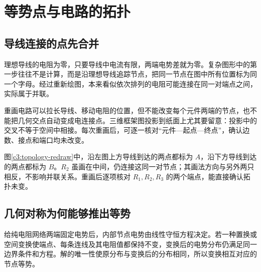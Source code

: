 \section{等势点与电路的拓扑}
\subsection{导线连接的点先合并}

理想导线的电阻为零，只要导线中电流有限，两端电势差就为零。复杂图形中的第一步往往不是计算，而是沿理想导线追踪节点，把同一节点在图中所有位置标为同一个字母。经过重新绘图，本来看似依次排列的电阻可能连接在同一对端点之间，实际属于并联。

重画电路可以拉长导线、移动电阻的位置，但不能改变每个元件两端的节点，也不能把几何交点自动变成电连接点。三维框架图投影到纸面上尤其要留意：投影中的交叉不等于空间中相接。每次重画后，可逐一核对“元件—起点—终点”，确认边数、接点和端口均未改变。

图\ref{c3:topology-redraw}中，沿左图上方导线到达的两点都标为 $A$，沿下方导线到达的两点都标为 $B$。$R_2$ 虽画在中间，仍连接这同一对节点；其画法方向与另外两只相反，不影响并联关系。重画后逐项核对 $R_1,R_2,R_3$ 的两个端点，能直接确认拓扑未变。

\subsection{几何对称为何能够推出等势}

给纯电阻网络两端固定电势后，内部节点电势由线性守恒方程决定。若一种置换或空间变换使端点、每条连线及其电阻值都保持不变，变换后的电势分布仍满足同一边界条件和方程。解的唯一性使原分布与变换后的分布相同，所以变换相互对应的节点等势。

